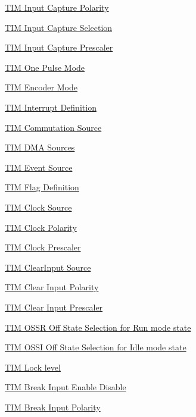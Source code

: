\begin{DoxyCompactItemize}
\hyperlink{group___t_i_m___input___capture___polarity}{T\+I\+M Input Capture Polarity}
\item 
\hyperlink{group___t_i_m___input___capture___selection}{T\+I\+M Input Capture Selection}
\item 
\hyperlink{group___t_i_m___input___capture___prescaler}{T\+I\+M Input Capture Prescaler}
\item 
\hyperlink{group___t_i_m___one___pulse___mode}{T\+I\+M One Pulse Mode}
\item 
\hyperlink{group___t_i_m___encoder___mode}{T\+I\+M Encoder Mode}
\item 
\hyperlink{group___t_i_m___interrupt__definition}{T\+I\+M Interrupt Definition}
\item 
\hyperlink{group___t_i_m___commutation___source}{T\+I\+M Commutation Source}
\item 
\hyperlink{group___t_i_m___d_m_a__sources}{T\+I\+M D\+M\+A Sources}
\item 
\hyperlink{group___t_i_m___event___source}{T\+I\+M Event Source}
\item 
\hyperlink{group___t_i_m___flag__definition}{T\+I\+M Flag Definition}
\item 
\hyperlink{group___t_i_m___clock___source}{T\+I\+M Clock Source}
\item 
\hyperlink{group___t_i_m___clock___polarity}{T\+I\+M Clock Polarity}
\item 
\hyperlink{group___t_i_m___clock___prescaler}{T\+I\+M Clock Prescaler}
\item 
\hyperlink{group___t_i_m___clear_input___source}{T\+I\+M Clear\+Input Source}
\item 
\hyperlink{group___t_i_m___clear_input___polarity}{T\+I\+M Clear Input Polarity}
\item 
\hyperlink{group___t_i_m___clear_input___prescaler}{T\+I\+M Clear Input Prescaler}
\item 
\hyperlink{group___t_i_m___o_s_s_r___off___state___selection__for___run__mode__state}{T\+I\+M O\+S\+S\+R Off State Selection for Run mode state}
\item 
\hyperlink{group___t_i_m___o_s_s_i___off___state___selection__for___idle__mode__state}{T\+I\+M O\+S\+S\+I Off State Selection for Idle mode state}
\item 
\hyperlink{group___t_i_m___lock__level}{T\+I\+M Lock level}
\item 
\hyperlink{group___t_i_m___break___input__enable__disable}{T\+I\+M Break Input Enable Disable}
\item 
\hyperlink{group___t_i_m___break___polarity}{T\+I\+M Break Input Polarity}

\end{DoxyCompactItemize}
